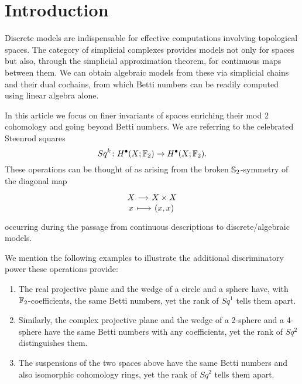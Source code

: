 
\section{Introduction}

Discrete models are indispensable for effective computations involving topological spaces.
The category of simplicial complexes provides models not only for spaces but also, through the simplicial approximation theorem, for continuous maps between them.
We can obtain algebraic models from these via simplicial chains and their dual cochains, from which Betti numbers can be readily computed using linear algebra alone.

In this article we focus on finer invariants of spaces enriching their mod 2 cohomology and going beyond Betti numbers.
We are referring to the celebrated Steenrod squares
\begin{equation*}
Sq^k \colon H^\bullet(X; {\mathbb{F}_2}) \to H^\bullet(X; {\mathbb{F}_2}).
\end{equation*}
These operations can be thought of as arising from the broken $\mathbb{S}_2$-symmetry of the diagonal map
\begin{equation*}
\begin{tikzcd}[column sep=small, row sep=-3pt]
X \arrow[r] & X \times X \\
x \arrow[r, mapsto] & (x,x)
\end{tikzcd}
\end{equation*}
occurring during the passage from continuous descriptions to discrete/algebraic models.

We mention the following examples to illustrate the additional discriminatory power these operations provide:
\begin{enumerate}
	\item The real projective plane and the wedge of a circle and a sphere have, with ${\mathbb{F}_2}$-coefficients, the same Betti numbers, yet the rank of $Sq^1$ tells them apart.
	\item Similarly, the complex projective plane and the wedge of a 2-sphere and a 4-sphere have the same Betti numbers with any coefficients, yet the rank of $Sq^2$ distinguishes them.
	\item The suspensions of the two spaces above have the same Betti numbers and also isomorphic cohomology rings, yet the rank of $Sq^2$ tells them apart.
\end{enumerate}

